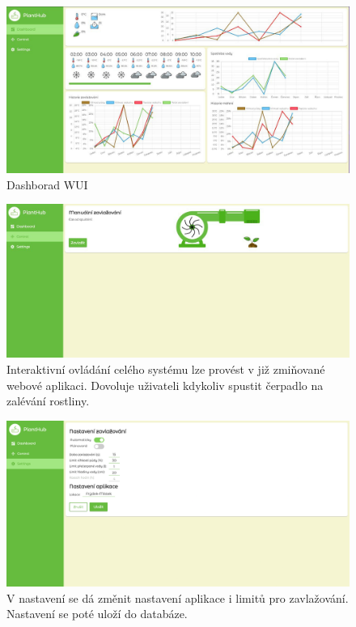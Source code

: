 \documentclass[12pt,a4paper]{article}
\begin{document}
\begin{figure}[h]
	\centering
	\includegraphics[width=\linewidth]{web-ui.png}
	\caption{Dashborad \ac{WUI}}
\end{figure}

\begin{figure}[h]
	\centering
	\includegraphics[width=\linewidth]{web-ui-pump.png}
	\caption{Interaktivní ovládání celého systému lze provést v již
		zmiňované webové aplikaci. Dovoluje uživateli kdykoliv spustit
		čerpadlo na
		zalévání rostliny.}
\end{figure}

\begin{figure}[h]
	\centering
	\includegraphics[width=\linewidth]{web-ui-settings.png}
	\caption{V nastavení se dá změnit nastavení aplikace i limitů pro
		zavlažování. Nastavení se poté uloží do databáze.}
\end{figure}
\end{document}
